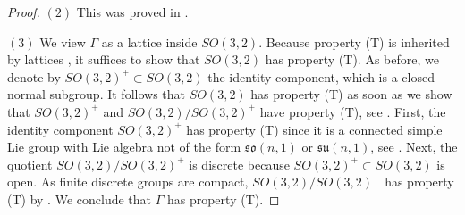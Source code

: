 \documentclass[11pt, letterpaper, oneside,reqno]{amsart}
\theoremstyle{plain}
\theoremstyle{underline}
\theoremstyle{definition}
\theoremstyle{remark}
\begin{document}
\begin{proof}
		$(2)$ This was proved in \cite[Prop.~3.4.3]{Lubotzky}.
		
		
		$(3)$ We view $\Gamma$ as a lattice inside $SO(3,2)$. Because property (T) is inherited by lattices \cite[Thm.~1.7.1]{Kazhdan}, it suffices to show that $SO(3,2)$ has property (T). As before, we denote by $SO(3,2)^{+}\subset SO(3,2)$ the identity component, which is a closed normal subgroup. It follows that $SO(3,2)$ has property (T) as soon as we show that $SO(3,2)^{+}$ and $SO(3,2)/SO(3,2)^{+}$ have property (T), see \cite[Prop.~1.7.6]{Kazhdan}. First, the identity component $SO(3,2)^{+}$ has property (T) since it is a connected simple Lie group with Lie algebra not of the form $\mathfrak{so}(n,1)$ or $\mathfrak{su}(n,1)$, see \cite[Thm.~3.5.4]{Kazhdan}. Next, the quotient $SO(3,2)/SO(3,2)^{+}$ is discrete because $SO(3,2)^{+}\subset SO(3,2)$ is open. As finite discrete groups are compact, $SO(3,2)/SO(3,2)^{+}$ has property (T) by \cite[Prop.~1.1.5]{Kazhdan}. We conclude that $\Gamma$ has property (T).
	\end{proof}
	
	\color{black}
	
\end{document}
